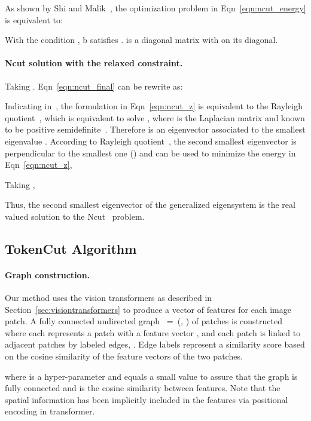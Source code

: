 \documentclass[twocolumn]{article}
\begin{document}
As shown by Shi and Malik~\cite{shi2000normalized}, the optimization problem in Eqn~\ref{eqn:ncut_energy} is equivalent to: 



With the condition ,  b satisfies .  is a diagonal matrix with  on its diagonal. 

\paragraph{Ncut solution with the relaxed constraint.}
Taking . Eqn~\ref{eqn:ncut_final} can be rewrite as: 



Indicating in~\cite{shi2000normalized}, the formulation in Eqn~\ref{eqn:ncut_z} is equivalent to the Rayleigh quotient~\cite{van1996matrix}, which is equivalent to solve , where  is the Laplacian matrix and known to be positive semidefinite~\cite{pothen1990partitioning}. Therefore  is an eigenvector associated to the smallest eigenvalue . According to Rayleigh quotient~\cite{van1996matrix}, the second smallest  eigenvector  is perpendicular to the smallest one () and can be used to minimize the energy in Eqn~\ref{eqn:ncut_z},



Taking ,



Thus, the second smallest eigenvector of the generalized
eigensystem  is the real valued solution to the Ncut~\cite{shi2000normalized} problem.

\subsection{TokenCut Algorithm}
\label{sec:tokencut}


\paragraph{Graph construction.} 


Our method uses the vision transformers as described in Section~\ref{sec:visiontransformers} to produce a vector of features for each  image patch. A fully connected undirected graph ~=~(, ) of patches is constructed  where each  represents a patch with a feature vector , and each patch is linked to adjacent patches by labeled edges,  . Edge labels represent a similarity score  based on the cosine similarity of the feature vectors of the two patches. 


where  is a hyper-parameter and  equals a small value  to assure that the graph is fully connected and  
 is the cosine similarity between features. Note that the spatial information has been implicitly included in the features via positional encoding in transformer. 
\end{document}
